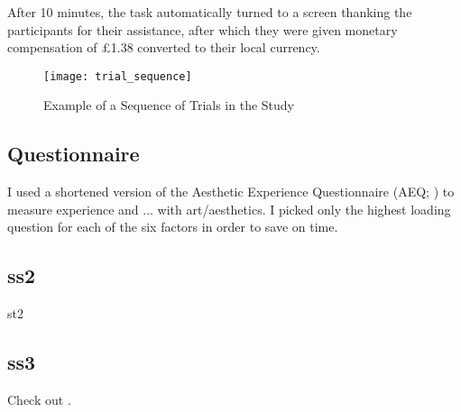 \documentclass[../main.tex]{subfiles}
\begin{document}
After 10 minutes, the task automatically turned to a screen thanking the participants for their assistance, after which they were given monetary compensation of £1.38 converted to their local currency.


\begin{figure}
	\centering
	\caption{Example of a Sequence of Trials in the Study}
	\label{fig:trial_sequence}
	\texttt{[image: trial\_sequence]}
\end{figure}


	\subsection{Questionnaire}
	I used a shortened version of the Aesthetic Experience Questionnaire (AEQ; \cite{wanzerExperiencingFlowViewing2020}) to measure experience and ... with art/aesthetics. I picked only the highest loading question for each of the six factors in order to save on time.

	\subsection{ss2}
	st2

	\subsection{ss3}
	Check out \textcite{goetschalckxGANalyzeVisualDefinitions2019}.
\end{document}
